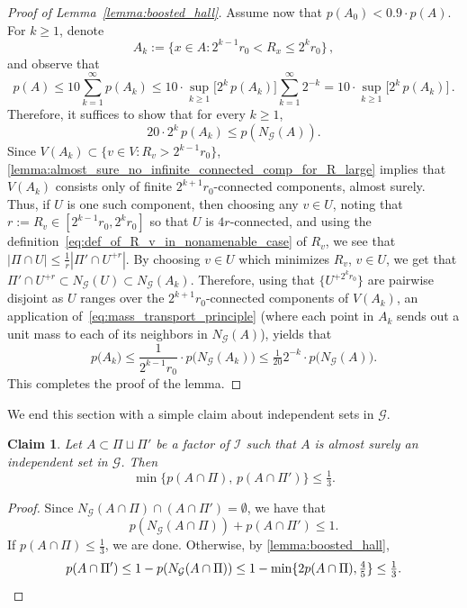 \documentclass[11pt, reqno]{article}
\newtheorem{claim}[thm]{Claim}
\numberwithin{equation}{section}
\theoremstyle{definition}
\def\cG{\mathcal{G}}
\newcommand{\1}{\mathds{1}}
\begin{document}
\begin{proof}[Proof of Lemma~\ref{lemma:boosted_hall}]
Assume now that $p(A_0) < 0.9 \cdot p(A)$.
For $k \ge 1$, denote
\[
A_k := \{ x \in A : 2^{k-1} r_0 < R_x \le 2^k r_0\} \, ,
\]
and observe that
\[ p(A) \le 10 \sum_{k=1}^\infty p(A_k) \le 10 \cdot \sup_{k \ge 1} \big[2^k \, p(A_k)\big]\sum_{k=1}^\infty 2^{-k} = 10 \cdot \sup_{k \ge 1} \big[2^k \, p(A_k)\big] \, . \]
Therefore, it suffices to show that for every $k \ge 1$,
\begin{equation}
    \label{eq:lower_bound_of_p_N_G_A_second_case}
 20 \cdot 2^k \, p(A_k) \le p(N_{\cG}(A)) .
\end{equation}
Since $V(A_k) \subset \{ v \in V : R_v > 2^{k-1}r_0 \}$, \cref{lemma:almost_sure_no_infinite_connected_comp_for_R_large} implies that $V(A_k)$ consists only of finite $2^{k+1} r_0$-connected components, almost surely.
Thus, if $U$ is one such component, then choosing any $v \in U$, noting that $r := R_v \in [2^{k-1}r_0,2^kr_0]$ so that $U$ is $4r$-connected, and using the definition~\eqref{eq:def_of_R_v_in_nonamenable_case} of $R_v$, we see that $|\Pi \cap U| \le \tfrac1r |\Pi' \cap U^{+r}|$. By choosing $v \in U$ which minimizes $R_v$, $v \in U$, we get that $\Pi' \cap U^{+r} \subset N_\cG(U) \subset N_\cG(A_k)$.
Therefore, using that $\{U^{+2^kr_0}\}$ are pairwise disjoint as $U$ ranges over the $2^{k+1} r_0$-connected components of $V(A_k)$, an application of~\eqref{eq:mass_transport_principle} (where each point in $A_k$ sends out a unit mass to each of its neighbors in $N_{\cG}(A)$), yields that
\[
p\big(A_k\big) \le \frac1{2^{k-1}r_0} \cdot p\big(N_{\cG}(A_k)\big) \le \tfrac1{20} 2^{-k} \cdot p\big(N_{\cG}(A)\big) .
\]
This completes the proof of the lemma.
\end{proof}
\noindent
We end this section with a simple claim about independent sets in $\cG$.
\begin{claim}\label{cl:indep-set-density}
    Let $A\subset \Pi \sqcup \Pi'$ be a factor of $\mathcal{I}$ such that $A$ is almost surely an independent set in $\cG$. Then
    \[
    \min\{ p(A \cap \Pi),\, p(A \cap \Pi') \} \le \tfrac13 .
    \]
\end{claim}
\begin{proof}
    Since $N_\cG(A \cap \Pi) \cap (A \cap \Pi') = \emptyset$, we have that
    \[ p(N_\cG(A \cap \Pi)) + p(A \cap \Pi') \le 1 .\]
    If $p(A \cap \Pi) \le \tfrac13$, we are done. Otherwise, by \cref{lemma:boosted_hall},
    \[ p(A \cap \Pi') \le 1 - p(N_\cG(A \cap \Pi)) \le 1 - \min\{2p(A \cap \Pi),\tfrac45\} \le \tfrac13 . \qedhere \]
\end{proof}
\end{document}
